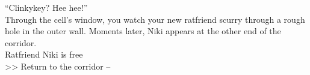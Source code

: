 “Clinkykey? Hee hee!”\\

Through the cell’s window, you watch your new ratfriend scurry through a rough hole in the outer wall. Moments later, Niki appears at the other end of the corridor.\\

 Ratfriend Niki is free\\
>> Return to the corridor -- 